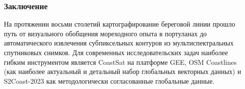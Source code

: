 \subsubsection{Заключение}

На протяжении восьми столетий картографирование береговой линии прошло путь от визуального обобщения мореходного опыта в портуланах до автоматического извлечения субпиксельных контуров из мультиспектральных спутниковых снимков. 
Для современных исследовательских задач наиболее гибким инструментом является CoastSat на платформе GEE, OSM Coastlines (как наиболее актуальный и детальный набор глобальных векторных данных) и S2Coast-2023 как методологически согласованные глобальные данные. 
